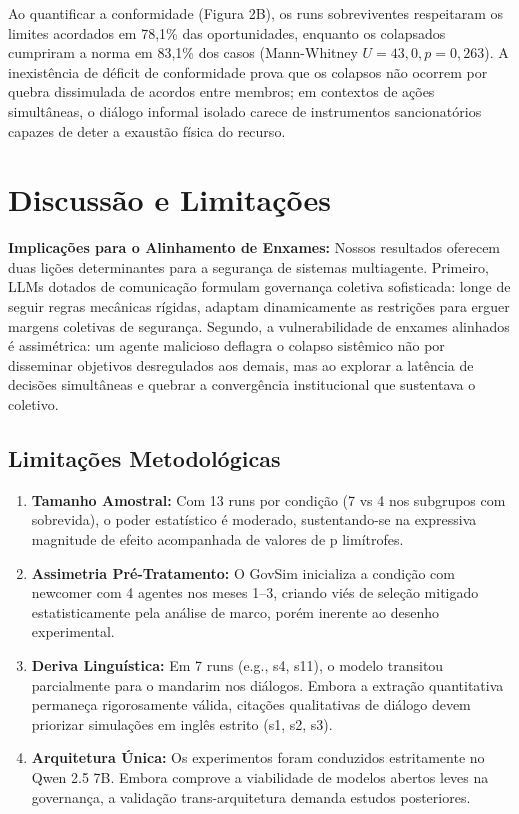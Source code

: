 ﻿\documentclass[11pt,a4paper]{article}
\begin{document}
Ao quantificar a conformidade (Figura 2B), os runs sobreviventes respeitaram os limites acordados em 78,1\% das oportunidades, enquanto os colapsados cumpriram a norma em 83,1\% dos casos (Mann-Whitney $U = 43,0, p = 0,263$). A inexistência de déficit de conformidade prova que os colapsos não ocorrem por quebra dissimulada de acordos entre membros; em contextos de ações simultâneas, o diálogo informal isolado carece de instrumentos sancionatórios capazes de deter a exaustão física do recurso.

\section{Discussão e Limitações}
\textbf{Implicações para o Alinhamento de Enxames:} Nossos resultados oferecem duas lições determinantes para a segurança de sistemas multiagente. Primeiro, LLMs dotados de comunicação formulam governança coletiva sofisticada: longe de seguir regras mecânicas rígidas, adaptam dinamicamente as restrições para erguer margens coletivas de segurança. Segundo, a vulnerabilidade de enxames alinhados é assimétrica: um agente malicioso deflagra o colapso sistêmico não por disseminar objetivos desregulados aos demais, mas ao explorar a latência de decisões simultâneas e quebrar a convergência institucional que sustentava o coletivo.

\subsection{Limitações Metodológicas}
\begin{enumerate}[leftmargin=*,itemsep=1pt]
    \item \textbf{Tamanho Amostral:} Com 13 runs por condição (7 vs 4 nos subgrupos com sobrevida), o poder estatístico é moderado, sustentando-se na expressiva magnitude de efeito acompanhada de valores de p limítrofes.
    \item \textbf{Assimetria Pré-Tratamento:} O GovSim inicializa a condição com newcomer com 4 agentes nos meses 1--3, criando viés de seleção mitigado estatisticamente pela análise de marco, porém inerente ao desenho experimental.
    \item \textbf{Deriva Linguística:} Em 7 runs (e.g., s4, s11), o modelo transitou parcialmente para o mandarim nos diálogos. Embora a extração quantitativa permaneça rigorosamente válida, citações qualitativas de diálogo devem priorizar simulações em inglês estrito (s1, s2, s3).
    \item \textbf{Arquitetura Única:} Os experimentos foram conduzidos estritamente no Qwen 2.5 7B. Embora comprove a viabilidade de modelos abertos leves na governança, a validação trans-arquitetura demanda estudos posteriores.
\end{enumerate}
\end{document}
